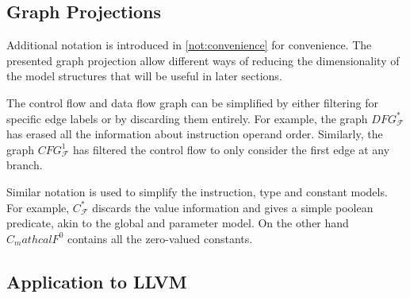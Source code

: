 \subsection{Graph Projections}

    Additional notation is introduced in \autoref{not:convenience} for
    convenience.
    The presented graph projection allow different ways of reducing the
    dimensionality of the model structures that will be useful in later
    sections.

    The control flow and data flow graph can be simplified by either filtering
    for specific edge labels or by discarding them entirely.
    For example, the graph $DFG_\mathcal F^*$ has erased all the information
    about instruction operand order.
    Similarly, the graph $CFG_\mathcal F^1$ has filtered the control flow to
    only consider the first edge at any branch.

    Similar notation is used to simplify the instruction, type and constant
    models.
    For example, $C_\mathcal F^*$ discards the value information and gives a
    simple poolean predicate, akin to the global and parameter model.
    On the other hand $C_mathcal F^0$ contains all the zero-valued constants.

\subsection{Application to LLVM}

